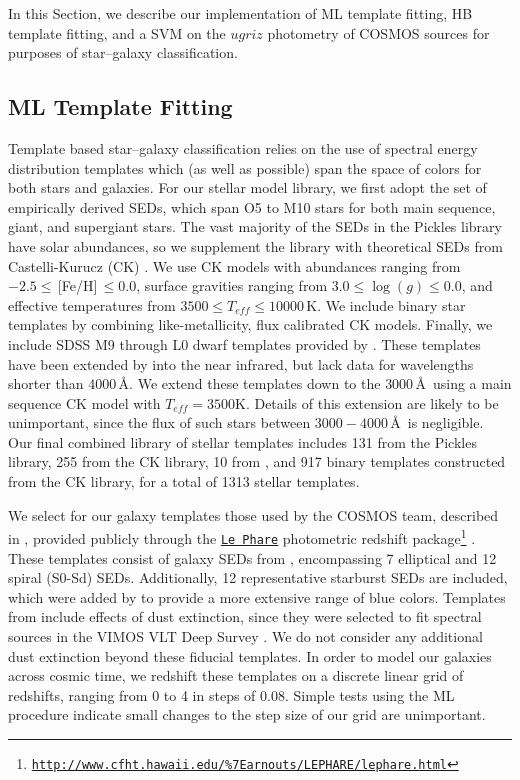 \documentclass[12pt,preprint]{aastex}
\begin{document}
In this Section, we describe our implementation of ML template
fitting, HB template fitting, and a SVM on the $ugriz$ photometry of
COSMOS sources for purposes of star--galaxy classification.

\subsection{ML Template Fitting}
\label{ssec:MLspecifics}

Template based star--galaxy classification relies on the use of
spectral energy distribution templates which (as well as possible)
span the space of colors for both stars and galaxies.  For our stellar
model library, we first adopt the \citet{pickles98} set of empirically
derived SEDs, which span O5 to M10 stars for both main sequence,
giant, and supergiant stars.  The vast majority of the SEDs in the
Pickles library have solar abundances, so we supplement the library
with theoretical SEDs from Castelli-Kurucz (CK) \citep{castelli04a}.
We use CK models with abundances ranging from $-2.5
\le\,$[Fe/H]$\,\le0.0$, surface gravities ranging from
$3.0\le\log(g)\le0.0$, and effective temperatures from $3500 \le
T_{eff} \le 10000\,$K.  We include binary star templates by combining
like-metallicity, flux calibrated CK models.  Finally, we include SDSS
M9 through L0 dwarf templates provided by \citet{bochanski07}.  These
templates have been extended by \citeauthor{bochanski07} into the near
infrared, but lack data for wavelengths shorter than $4000\,$\AA.  We
extend these templates down to the $3000\,$\AA\, using a main sequence
CK model with $T_{eff}=3500$K.  Details of this extension are likely
to be unimportant, since the flux of such stars between
$3000-4000\,$\AA\, is negligible.  Our final combined library of stellar
templates includes 131 from the Pickles library, 255 from the CK library,
10 from \citet{bochanski07}, and 917 binary templates constructed from
the CK library, for a total of 1313 stellar templates.

We select for our galaxy templates those used by the COSMOS team,
described in \citep{ilbert09}, provided publicly through the
\href{http://www.cfht.hawaii.edu/\%7Earnouts/LEPHARE/lephare.html}
{\texttt{Le Phare}} photometric redshift package\footnote{
\href{http://www.cfht.hawaii.edu/\%7Earnouts/LEPHARE/lephare.html}
{\tt http://www.cfht.hawaii.edu/\%7Earnouts/LEPHARE/lephare.html}}
\citep{arnouts99,ilbert06}.  These templates consist of galaxy SEDs
from \citet{polletta07}, encompassing 7 elliptical and 12 spiral
(S0-Sd) SEDs.  Additionally, 12 representative starburst SEDs are
included, which were added by \citet{ilbert09} to provide a more
extensive range of blue colors.  Templates from \citet{polletta07}
include effects of dust extinction, since they were selected to fit
spectral sources in the VIMOS VLT Deep Survey \citep{lefevre05}.  We
do not consider any additional dust extinction beyond these fiducial
templates.  In order to model our galaxies across cosmic time, we
redshift these templates on a discrete linear grid of redshifts,
ranging from 0 to 4 in steps of 0.08.  Simple tests using the ML
procedure indicate small changes to the step size of our grid are
unimportant. 
\end{document}
